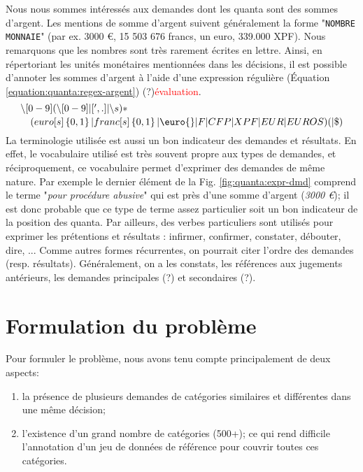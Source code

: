 Nous nous sommes intéressés aux demandes dont les quanta sont des sommes d'argent. Les mentions de somme d'argent suivent généralement la forme "\verb=NOMBRE MONNAIE=" (par ex. 3000 \euro{}, 15 503 676 francs, un euro, 339.000 XPF). Nous remarquons que les nombres sont très rarement écrites en lettre. Ainsi, en répertoriant les unités monétaires mentionnées dans les décisions, il est possible d'annoter les sommes d'argent à l'aide d'une expression régulière (Équation \ref{equation:quanta:regex-argent}) (?)\textcolor{red}{évaluation}.
\begin{equation} %
\splitdfrac{\backslash [0-9](\backslash [0-9]|[',.]|\backslash s)*}{(euro[s]\left\{0,1\right\}|franc[s]\left\{0,1\right\}|\euro{}|F|CFP|XPF|EUR|EUROS)( |\$)}\label{equation:quanta:regex-argent} %
\end{equation}
La terminologie utilisée est aussi un bon indicateur des demandes et résultats. En effet, le vocabulaire utilisé est très souvent propre aux types de demandes, et réciproquement, ce vocabulaire permet d'exprimer des demandes de même nature. Par exemple le dernier élément de la Fig. \ref{fig:quanta:expr-dmd} comprend le terme "\textit{pour procédure abusive}" qui est près d'une somme d'argent (\textit{3000 \euro{}}); il est donc probable que ce type de terme assez particulier soit un bon indicateur de la position des quanta. Par ailleurs, des verbes particuliers sont utilisés pour exprimer les prétentions et résultats : infirmer, confirmer, constater, débouter, dire, ... Comme autres formes récurrentes, on pourrait citer l'ordre des demandes (resp. résultats). Généralement, on a les constats, les références aux jugements antérieurs, les demandes principales (?) et secondaires (?).

\section{Formulation du problème}
\label{sec:quanta:formulation}
Pour formuler le problème, nous avons tenu compte principalement de deux aspects:
\begin{enumerate}
    \item la présence de plusieurs demandes de catégories similaires et différentes dans une même décision;
    \item l'existence d'un grand nombre de catégories (500+); ce qui rend difficile l'annotation d'un jeu de données de référence pour couvrir toutes ces catégories.
\end{enumerate}

